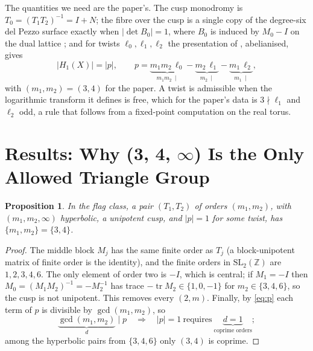\documentclass[11pt,a4paper]{article}
\newcommand{\ZZ}{\mathbb{Z}}
\newcommand{\SL}{\mathrm{SL}}
\theoremstyle{plain}
\newtheorem{proposition}{Proposition}
\theoremstyle{definition}
\begin{document}
The quantities we need are the paper's. The cusp monodromy is
$T_0 = (T_1T_2)^{-1} = I + N$; the fibre over the cusp is a single copy of
the degree-six del Pezzo surface exactly when $|\det B_0| = 1$, where $B_0$
is induced by $M_0 - I$ on the dual lattice \cite[Lemma~2.6]{Alpoge}; and for twists $\ell_0, \ell_1, \ell_2$ the
presentation of \cite[Theorem~7.17]{Alpoge}, abelianised, gives
\begin{equation}
  |H_1(X)| = |p|, \qquad p = \underbrace{m_1m_2\,\ell_0}_{m_1m_2\ \mid} - \underbrace{m_2\,\ell_1}_{m_2\ \mid} - \underbrace{m_1\,\ell_2}_{m_1\ \mid},
  \label{eq:p}
\end{equation}
with $(m_1, m_2) = (3, 4)$ for the paper. A twist is admissible when the
logarithmic transform it defines is free, which for the paper's data is
$3 \nmid \ell_1$ and $\ell_2$ odd, a rule that follows from a fixed-point computation on the real torus.


\section{Results: Why (3, 4, \texorpdfstring{$\infty$}{infinity}) Is the Only Allowed Triangle Group}
\label{sec:triangle}

\begin{proposition}
\label{prop:triangle}
In the flag class, a pair $(T_1, T_2)$ of orders $(m_1, m_2)$, with
$(m_1, m_2, \infty)$ hyperbolic, a unipotent cusp, and $|p| = 1$ for some
twist, has $\{m_1, m_2\} = \{3, 4\}$.
\end{proposition}

\begin{proof}
The middle block $M_j$ has the same finite order as $T_j$ (a block-unipotent
matrix of finite order is the identity), and the finite orders in
$\SL_2(\ZZ)$ are $1, 2, 3, 4, 6$. The only element of order two is $-I$,
which is central; if $M_1 = -I$ then $M_0 = (M_1M_2)^{-1} = -M_2^{-1}$ has
trace $-\operatorname{tr} M_2 \in \{1, 0, -1\}$ for $m_2 \in \{3, 4, 6\}$,
so the cusp is not unipotent. This removes every $(2, m)$. Finally, by \eqref{eq:p} each term of $p$ is divisible by $\gcd(m_1,m_2)$, so
\[
  \underbrace{\gcd(m_1,m_2)}_{d}\;\Big|\;p
  \quad\Longrightarrow\quad |p|=1\ \text{requires}\ \underbrace{d=1}_{\text{coprime orders}};
\] among the hyperbolic pairs from
$\{3, 4, 6\}$ only $(3,4)$ is coprime.
\end{proof}
\end{document}

